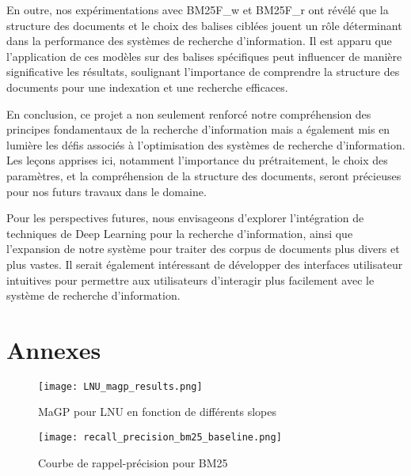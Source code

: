 \documentclass[a4paper, 12pt]{article}
\begin{document}
En outre, nos expérimentations avec BM25F_w et BM25F_r ont révélé que la structure des documents et le choix des balises ciblées jouent un rôle déterminant dans la performance des systèmes de recherche d'information. Il est apparu que l'application de ces modèles sur des balises spécifiques peut influencer de manière significative les résultats, soulignant l'importance de comprendre la structure des documents pour une indexation et une recherche efficaces.

En conclusion, ce projet a non seulement renforcé notre compréhension des principes fondamentaux de la recherche d'information mais a également mis en lumière les défis associés à l'optimisation des systèmes de recherche d'information. Les leçons apprises ici, notamment l'importance du prétraitement, le choix des paramètres, et la compréhension de la structure des documents, seront précieuses pour nos futurs travaux dans le domaine.

Pour les perspectives futures, nous envisageons d'explorer l'intégration de techniques de Deep Learning pour la recherche d'information, ainsi que l'expansion de notre système pour traiter des corpus de documents plus divers et plus vastes. Il serait également intéressant de développer des interfaces utilisateur intuitives pour permettre aux utilisateurs d'interagir plus facilement avec le système de recherche d'information.

\newpage

\section{Annexes}

\begin{figure}[h]
    \centering
    \texttt{[image: LNU\_magp\_results.png]}
    \caption{MaGP pour LNU en fonction de différents slopes}
    \label{fig:lnu_results}
\end{figure}

\begin{figure}[h]
    \centering
    \texttt{[image: recall\_precision\_bm25\_baseline.png]}
    \caption{Courbe de rappel-précision pour BM25}
    \label{fig:rap_prec_best_art_bm25}
\end{figure}
\end{document}
